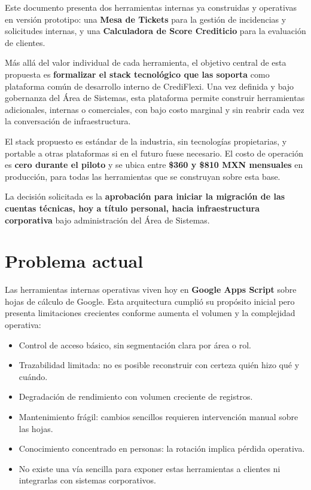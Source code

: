 \documentclass[12pt,a4paper]{article}
\begin{document}
Este documento presenta dos herramientas internas ya construidas y operativas en versión prototipo:
una \textbf{Mesa de Tickets} para la gestión de incidencias y solicitudes internas,
y una \textbf{Calculadora de Score Crediticio} para la evaluación de clientes.

Más allá del valor individual de cada herramienta,
el objetivo central de esta propuesta es \textbf{formalizar el stack tecnológico que las soporta}
como plataforma común de desarrollo interno de CrediFlexi.
Una vez definida y bajo gobernanza del Área de Sistemas,
esta plataforma permite construir herramientas adicionales,
internas o comerciales,
con bajo costo marginal y sin reabrir cada vez la conversación de infraestructura.

El stack propuesto es estándar de la industria, sin tecnologías propietarias,
y portable a otras plataformas si en el futuro fuese necesario.
El costo de operación es \textbf{cero durante el piloto}
y se ubica entre \textbf{\$360 y \$810 MXN mensuales} en producción,
para todas las herramientas que se construyan sobre esta base.

La decisión solicitada es la \textbf{aprobación para iniciar la migración
de las cuentas técnicas, hoy a título personal, hacia infraestructura corporativa}
bajo administración del Área de Sistemas.

\section{Problema actual}

Las herramientas internas operativas viven hoy en \textbf{Google Apps Script}
sobre hojas de cálculo de Google.
Esta arquitectura cumplió su propósito inicial
pero presenta limitaciones crecientes conforme aumenta el volumen y la complejidad operativa:

\begin{itemize}
  \item Control de acceso básico, sin segmentación clara por área o rol.
  \item Trazabilidad limitada: no es posible reconstruir con certeza quién hizo qué y cuándo.
  \item Degradación de rendimiento con volumen creciente de registros.
  \item Mantenimiento frágil: cambios sencillos requieren intervención manual sobre las hojas.
  \item Conocimiento concentrado en personas: la rotación implica pérdida operativa.
  \item No existe una vía sencilla para exponer estas herramientas a clientes
        ni integrarlas con sistemas corporativos.
\end{itemize}
\end{document}
